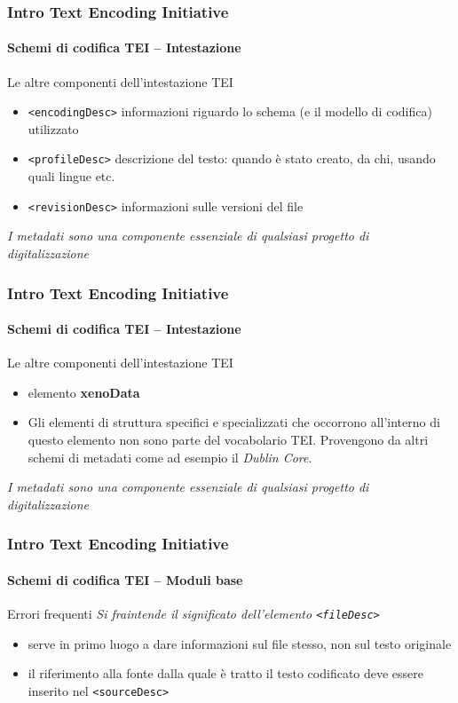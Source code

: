 \begin{frame}
	\frametitle{Intro Text Encoding Initiative}
	\framesubtitle{Schemi di codifica TEI – Intestazione}
	\addtocounter{nframe}{1}

    \begin{block}{Le altre componenti dell’intestazione TEI}
        \begin{itemize}
            \item \texttt{<encodingDesc>} informazioni riguardo lo schema (e il
            modello di codifica) utilizzato
            \item  \texttt{<profileDesc>} descrizione del testo: quando è stato
            creato, da chi, usando quali lingue etc.
            \item \texttt{<revisionDesc>} informazioni sulle versioni del file
        \end{itemize}
    \end{block}
    \textit{I metadati sono una componente essenziale di qualsiasi
        progetto di digitalizzazione}
\end{frame}
\begin{frame}
	\frametitle{Intro Text Encoding Initiative}
	\framesubtitle{Schemi di codifica TEI – Intestazione}
	\addtocounter{nframe}{1}

    \begin{block}{Le altre componenti dell’intestazione TEI}
        \begin{itemize}
            \item elemento \textbf{xenoData}
            \item[] Gli elementi di struttura specifici e specializzati che occorrono all'interno di questo elemento non sono parte del vocabolario TEI. Provengono da altri schemi di metadati come ad esempio il \textit{Dublin Core}.
        \end{itemize}
    \end{block}
    \textit{I metadati sono una componente essenziale di qualsiasi
        progetto di digitalizzazione}
\end{frame}




\begin{frame}
	\frametitle{Intro Text Encoding Initiative}
	\framesubtitle{Schemi di codifica TEI – Moduli base}
	\addtocounter{nframe}{1}

	\begin{block}{Errori frequenti}
        \textit{Si fraintende il significato dell’elemento \texttt{<fileDesc>}}
        \begin{itemize}
            \item serve in primo luogo a dare informazioni sul file stesso, non sul testo originale
            \item il riferimento alla fonte dalla quale è tratto il testo codificato
            deve essere inserito nel \texttt{<sourceDesc>}
        \end{itemize}
    \end{block}

\end{frame}

